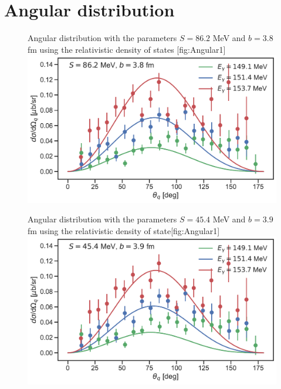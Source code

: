 \chapter{Angular distribution}
\begin{figure}[H]
	\begin{sidecaption}{Angular distribution with the parameters $S=86.2$ MeV and $b=3.8$ fm using the relativistic density of states }[fig:Angular1]
		\includegraphics[width=\linewidth]{Figures/MultiDiffcross_rel.pdf}
	\end{sidecaption}
\end{figure}
\begin{figure}[H]
	\begin{sidecaption}{Angular distribution with the parameters $S=45.4$ MeV and $b=3.9$ fm using the relativistic density of state}[fig:Angular1]
		\includegraphics[width=\linewidth]{Figures/MultiDiffcross_rel_2.pdf}
	\end{sidecaption}
\end{figure}
